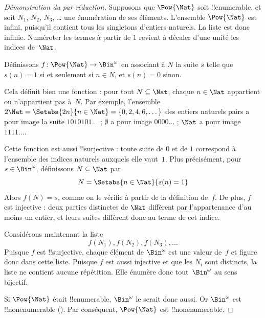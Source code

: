 \documentclass[../../../include/open-logic-section]{subfiles}
\begin{document}
\begin{proof}[Démonstration du {} par réduction]
Supposons que $\Pow{\Nat}$ soit !!{enumerable}, et soit
$N_{1}$, $N_{2}$, $N_{3}$, \dots{} une énumération de ses
éléments. L'ensemble $\Pow{\Nat}$ est infini, puisqu'il
contient tous les singletons d'entiers naturels. La liste est
donc infinie. Numéroter les termes à partir de $1$ revient à
décaler d'une unité les indices de~$\Nat$.

Définissons $f \colon \Pow{\Nat} \to \Bin^\omega$ en associant
à $N$ la suite $s$ telle que $s(n) = 1$ si et seulement si
$n \in N$, et $s(n) = 0$ sinon.
%
%

Cela définit bien une fonction : pour tout $N \subseteq \Nat$,
chaque $n \in \Nat$ appartient ou n'appartient pas à~$N$.
Par exemple, l'ensemble $2\Nat = \Setabs{2n}{n \in \Nat}
= \{0,2, 4, 6, \dots\}$ des entiers naturels pairs a pour
image la suite $1010101\dots$ ; $\emptyset$ a pour image
$0000\dots$ ; $\Nat$ a pour image $1111\dots$.

Cette fonction est aussi !!{surjective} : toute suite de $0$ et
de $1$ correspond à l'ensemble des indices naturels auxquels
elle vaut~$1$. Plus précisément, pour $s \in \Bin^\omega$,
définissons $N \subseteq \Nat$ par
\[
N = \Setabs{n \in \Nat}{s(n) = 1}
\]
Alors $f(N) = s$, comme on le vérifie à partir de la définition
de~$f$. De plus, $f$ est injective : deux parties distinctes de
$\Nat$ diffèrent par l'appartenance d'au moins un entier, et
leurs suites diffèrent donc au terme de cet indice.
%
%
%

Considérons maintenant la liste
\[
f(N_1), f(N_2), f(N_3), \dots
\]
Puisque $f$ est !!{surjective}, chaque élément de $\Bin^\omega$
est une valeur de~$f$ et figure donc dans cette liste. Puisque
$f$ est aussi injective et que les $N_i$ sont distincts, la
liste ne contient aucune répétition. Elle énumère donc
tout~$\Bin^\omega$ au sens bijectif.

Si $\Pow{\Nat}$ était !!{enumerable}, $\Bin^\omega$ le serait
donc aussi. Or $\Bin^\omega$ est !!{nonenumerable}
(). Par conséquent,
$\Pow{\Nat}$ est !!{nonenumerable}.
\end{proof}

%
%
%
%
%
%
%
\end{document}
